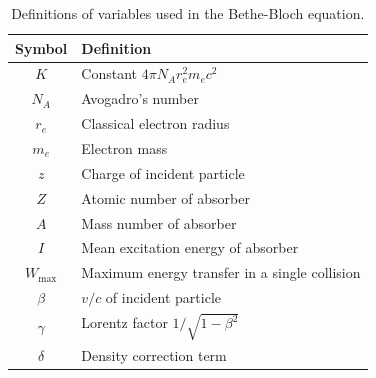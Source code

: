 \begin{table}[h!]
\centering
\begin{tabular}{c l}
\hline
\hline
\textbf{Symbol} & \textbf{Definition} \\
\hline
$K$ & Constant $4\pi N_A r_e^2 m_e c^2$ \\
$N_A$ & Avogadro’s number \\
$r_e$ & Classical electron radius \\
$m_e$ & Electron mass \\
$z$ & Charge of incident particle \\
$Z$ & Atomic number of absorber \\
$A$ & Mass number of absorber \\
$I$ & Mean excitation energy of absorber \\
$W_{\mathrm{max}}$ & Maximum energy transfer in a single collision \\
$\beta$ & $v/c$ of incident particle \\
$\gamma$ & Lorentz factor $1/\sqrt{1-\beta^2}$ \\
$\delta$ & Density correction term \\
\hline
\hline
\end{tabular}
\caption{Definitions of variables used in the Bethe-Bloch equation.}
\label{tab:bethe_bloch_vars}
\end{table}